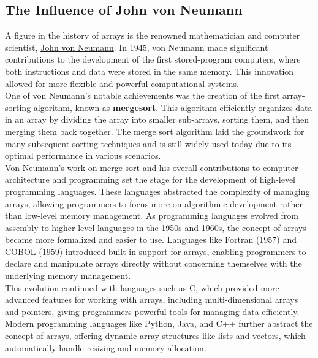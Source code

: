 \documentclass[12pt, oneside]{book}
\begin{document}
\subsection{The Influence of John von Neumann}
A figure in the history of arrays is the renowned mathematician and computer scientist, \href{https://en.wikipedia.org/wiki/John_von_Neumann#Computer_science}{John von Neumann}. In 1945, von Neumann made significant contributions to the development of the first stored-program computers, where both instructions and data were stored in the same memory. This innovation allowed for more flexible and powerful computational systems.\\One of von Neumann's notable achievements was the creation of the first array-sorting algorithm, known as \textbf{mergesort}. This algorithm efficiently organizes data in an array by dividing the array into smaller sub-arrays, sorting them, and then merging them back together. The merge sort algorithm laid the groundwork for many subsequent sorting techniques and is still widely used today due to its optimal performance in various scenarios.\\Von Neumann’s work on merge sort and his overall contributions to computer architecture and programming set the stage for the development of high-level programming languages. These languages abstracted the complexity of managing arrays, allowing programmers to focus more on algorithmic development rather than low-level memory management.
As programming languages evolved from assembly to higher-level languages in the 1950s and 1960s, the concept of arrays became more formalized and easier to use. Languages like Fortran (1957) and COBOL (1959) introduced built-in support for arrays, enabling programmers to declare and manipulate arrays directly without concerning themselves with the underlying memory management.\\This evolution continued with languages such as C, which provided more advanced features for working with arrays, including multi-dimensional arrays and pointers, giving programmers powerful tools for managing data efficiently. Modern programming languages like Python, Java, and C++ further abstract the concept of arrays, offering dynamic array structures like lists and vectors, which automatically handle resizing and memory allocation.
\end{document}
